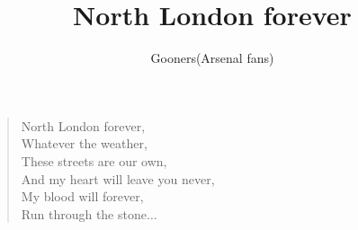 \documentclass[a4paper,12pt]{article}
\title{North London forever}
\author{Gooners(Arsenal fans)}
\date{}
\begin{document}
	
	\maketitle
	
	\begin{verse}
		
		North London forever, \\
		Whatever the weather, \\
		These streets are our own, \\
		And my heart will leave you never, \\
		My blood will forever, \\
		Run through the stone$\ldots$
		
	\end{verse}
	
\end{document}
